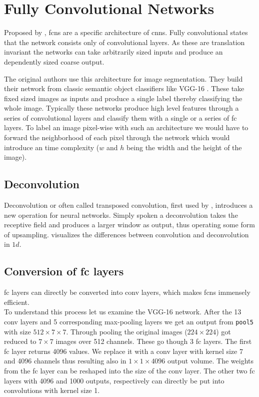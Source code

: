 \section{Fully Convolutional Networks}
\label{sec:concepts:fcn}
Proposed by \citet{long_fully_2015}, \glspl{fcn} are a specific architecture of \glspl{cnn}. Fully convolutional states that the network consists only of convolutional layers. As these are translation invariant the networks can take arbitrarily sized inputs and produce an dependently sized coarse output.

The original authors use this architecture for image segmentation. They build their network from classic semantic object classifiers like VGG-16 \citep{simonyan_very_2014}. These take fixed sized images as inputs and produce a single label thereby classifying the whole image. Typically these networks produce high level features through a series of convolutional layers and classify them with a single or a series of \gls{fc} layers. To label an image pixel-wise with such an architecture we would have to forward the neighborhood of each pixel through the network which would introduce an  time complexity ($w$ and $h$ being the width and the height of the image).

\subsection{Deconvolution} %
\label{sub:conepts:fcn:deconv}

Deconvolution or often called transposed convolution, first used by \citet{zeiler_deconvolutional_2010}, introduces a new operation for neural networks. Simply spoken a deconvolution takes the receptive field and produces a larger window as output, thus operating some form of upsampling.  visualizes the differences between convolution and deconvolution in $1d$.

\subsection{Conversion of \gls{fc} layers}
\label{sub:concepts:fcn:fc_conversion}
\gls{fc} layers can directly be converted into \gls{conv} layers, which makes \glspl{fcn} immensely efficient.\\
To understand this process let us examine the VGG-16 network. After the 13 \gls{conv} layers and 5  corresponding max-pooling layers we get an output from \texttt{pool5} with size $512\times7\times7$. Through pooling the original images ($224\times224$) got reduced to $7\times7$ images over 512 channels. These go though 3 \gls{fc} layers. The first \gls{fc} layer returns 4096 values. We replace it with a \gls{conv} layer with kernel size 7 and 4096 channels thus resulting also in $1\times1\times4096$ output volume. The weights from the \gls{fc} layer can be reshaped into the size of the \gls{conv} layer. The other two \gls{fc} layers with 4096 and 1000 outputs, respectively can directly be put into convolutions with kernel size 1.

